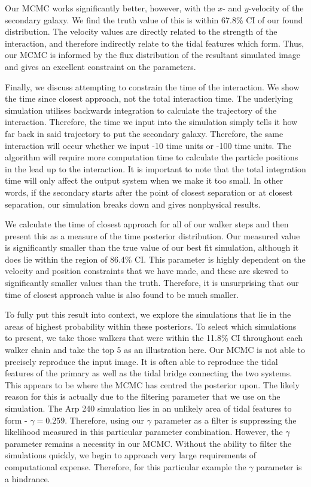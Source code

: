 Our MCMC works significantly better, however, with the $x$- and $y$-velocity of the secondary galaxy. We find the truth value of this is within 67.8\% CI of our found distribution. The velocity values are directly related to the strength of the interaction, and therefore indirectly relate to the tidal features which form. Thus, our MCMC is informed by the flux distribution of the resultant simulated image and gives an excellent constraint on the parameters.

Finally, we discuss attempting to constrain the time of the interaction. We show the time since closest approach, not the total interaction time. The underlying simulation utilises backwards integration to calculate the trajectory of the interaction. Therefore, the time we input into the simulation simply tells it how far back in said trajectory to put the secondary galaxy. Therefore, the same interaction will occur whether we input -10 time units or -100 time units. The algorithm will require more computation time to calculate the particle positions in the lead up to the interaction. It is important to note that the total integration time will only affect the output system when we make it too small. In other words, if the secondary starts after the point of closest separation or at closest separation, our simulation breaks down and gives nonphysical results.

We calculate the time of closest approach for all of our walker steps and then present this as a measure of the time posterior distribution. Our measured value is significantly smaller than the true value of our best fit simulation, although it does lie within the region of 86.4\% CI. This parameter is highly dependent on the velocity and position constraints that we have made, and these are skewed to significantly smaller values than the truth. Therefore, it is unsurprising that our time of closest approach value is also found to be much smaller.

To fully put this result into context, we explore the simulations that lie in the areas of highest probability within these posteriors. To select which simulations to present, we take those walkers that were within the 11.8\% CI throughout each walker chain and take the top 5 as an illustration here. Our MCMC is not able to precisely reproduce the input image. It is often able to reproduce the tidal features of the primary as well as the tidal bridge connecting the two systems. This appears to be where the MCMC has centred the posterior upon. The likely reason for this is actually due to the filtering parameter that we use on the simulation. The Arp 240 simulation lies in an unlikely area of tidal features to form - $\gamma = 0.259$. Therefore, using our $\gamma$ parameter as a filter is suppressing the likelihood measured in this particular parameter combination. However, the $\gamma$ parameter remains a necessity in our MCMC. Without the ability to filter the simulations quickly, we begin to approach very large requirements of computational expense. Therefore, for this particular example the $\gamma$ parameter is a hindrance.

